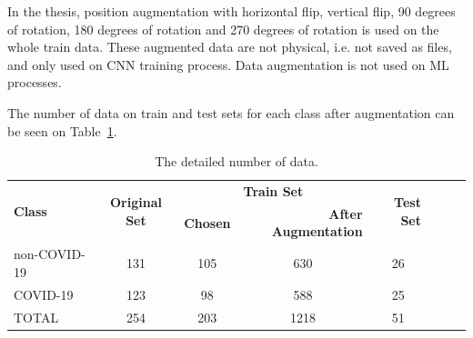 In the thesis, position augmentation with horizontal flip, vertical flip, 90 degrees of rotation, 180 degrees of rotation and 270 degrees of rotation is used on the whole train data. These augmented data are not physical, i.e. not saved as files, and only used on CNN training process. Data augmentation is not used on ML processes.

The number of data on train and test sets for each class after augmentation can be seen on Table~\ref{tab:final_dataset_size}.


\begin{table}[h]
{
    \setlength{\tabcolsep}{14pt}
    \caption{The detailed number of data.}
    \begin{center}
    \begin{tabular}{lccrrrrr}
    \hline\hline
    \multirow{2}{*}{\textbf{Class}} & \multirow{2}{*}{\textbf{Original Set}} & \multicolumn{2}{c}{\textbf{Train Set}} & \multirow{2}{*}{\textbf{Test Set}} \\ \cline{3-4}
                           &                               & \textbf{Chosen}  & \textbf{After Augmentation}  &    \\
    \hline
    non-COVID-19           & 131                           & 105     & \multicolumn{1}{c}{630} & \multicolumn{1}{c}{26} \\
    COVID-19               & 123                           & 98      & \multicolumn{1}{c}{588} & \multicolumn{1}{c}{25} \\
    TOTAL                  & 254                           & 203     & \multicolumn{1}{c}{1218} & \multicolumn{1}{c}{51} \\   
    \hline
    \end{tabular}
    \end{center}
    \label{tab:final_dataset_size}
}
\end{table}

